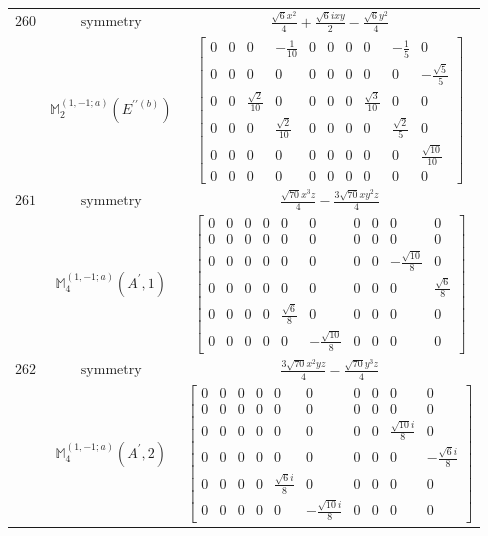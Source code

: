 \documentclass[fleqn,8pt,landscape]{jsarticle}
\begin{document}
\begin{longtable}{ccc}
$ 260 $ & $ \text{symmetry} $ & $ \frac{\sqrt{6} x^{2}}{4} + \frac{\sqrt{6} i x y}{2} - \frac{\sqrt{6} y^{2}}{4} $ \\
$  $ & $ \mathbb{M}_{2}^{(1,-1;a)}(E^{\prime\prime(b)}) $ & $ \begin{bmatrix} 0 & 0 & 0 & - \frac{1}{10} & 0 & 0 & 0 & 0 & - \frac{1}{5} & 0 \\ 0 & 0 & 0 & 0 & 0 & 0 & 0 & 0 & 0 & - \frac{\sqrt{5}}{5} \\ 0 & 0 & \frac{\sqrt{2}}{10} & 0 & 0 & 0 & 0 & \frac{\sqrt{3}}{10} & 0 & 0 \\ 0 & 0 & 0 & \frac{\sqrt{2}}{10} & 0 & 0 & 0 & 0 & \frac{\sqrt{2}}{5} & 0 \\ 0 & 0 & 0 & 0 & 0 & 0 & 0 & 0 & 0 & \frac{\sqrt{10}}{10} \\ 0 & 0 & 0 & 0 & 0 & 0 & 0 & 0 & 0 & 0 \end{bmatrix} $ \\ \hline
$ 261 $ & $ \text{symmetry} $ & $ \frac{\sqrt{70} x^{3} z}{4} - \frac{3 \sqrt{70} x y^{2} z}{4} $ \\
$  $ & $ \mathbb{M}_{4}^{(1,-1;a)}(A^{\prime},1) $ & $ \begin{bmatrix} 0 & 0 & 0 & 0 & 0 & 0 & 0 & 0 & 0 & 0 \\ 0 & 0 & 0 & 0 & 0 & 0 & 0 & 0 & 0 & 0 \\ 0 & 0 & 0 & 0 & 0 & 0 & 0 & 0 & - \frac{\sqrt{10}}{8} & 0 \\ 0 & 0 & 0 & 0 & 0 & 0 & 0 & 0 & 0 & \frac{\sqrt{6}}{8} \\ 0 & 0 & 0 & 0 & \frac{\sqrt{6}}{8} & 0 & 0 & 0 & 0 & 0 \\ 0 & 0 & 0 & 0 & 0 & - \frac{\sqrt{10}}{8} & 0 & 0 & 0 & 0 \end{bmatrix} $ \\ \hline
$ 262 $ & $ \text{symmetry} $ & $ \frac{3 \sqrt{70} x^{2} y z}{4} - \frac{\sqrt{70} y^{3} z}{4} $ \\
$  $ & $ \mathbb{M}_{4}^{(1,-1;a)}(A^{\prime},2) $ & $ \begin{bmatrix} 0 & 0 & 0 & 0 & 0 & 0 & 0 & 0 & 0 & 0 \\ 0 & 0 & 0 & 0 & 0 & 0 & 0 & 0 & 0 & 0 \\ 0 & 0 & 0 & 0 & 0 & 0 & 0 & 0 & \frac{\sqrt{10} i}{8} & 0 \\ 0 & 0 & 0 & 0 & 0 & 0 & 0 & 0 & 0 & - \frac{\sqrt{6} i}{8} \\ 0 & 0 & 0 & 0 & \frac{\sqrt{6} i}{8} & 0 & 0 & 0 & 0 & 0 \\ 0 & 0 & 0 & 0 & 0 & - \frac{\sqrt{10} i}{8} & 0 & 0 & 0 & 0 \end{bmatrix} $ \\ \hline

\end{longtable}
\end{document}
